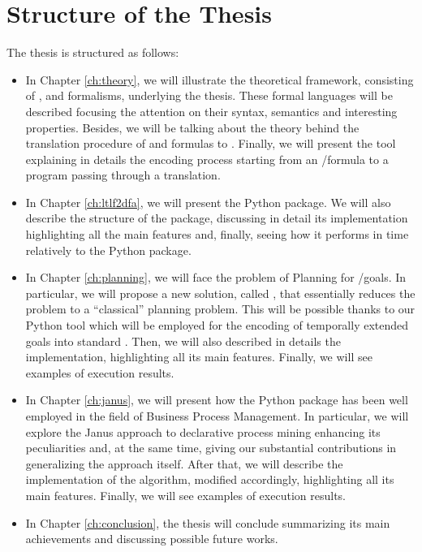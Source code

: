\section{Structure of the Thesis}
The thesis is structured as follows:
\begin{itemize}
\item In Chapter \ref{ch:theory}, we will illustrate the theoretical framework, consisting of \LTL, \LTLf and \PLTL formalisms, underlying the thesis. These formal languages will be described focusing the attention on their syntax, semantics and interesting properties. Besides, we will be talking about the theory behind the translation procedure of \LTLf and \PLTL formulas to \DFAs. Finally, we will present the \MONA tool explaining in details the encoding process starting from an \LTLf/\PLTL formula to a \MONA program passing through a \FOL translation.

\item In Chapter \ref{ch:ltlf2dfa}, we will present the \LTLfToDFA Python package. We will also describe the structure of the package, discussing in detail its implementation highlighting all the main features and, finally, seeing how it performs in time relatively to the \FLLOAT Python package.

\item In Chapter \ref{ch:planning}, we will face the problem of \FOND Planning for \LTLf/\PLTL goals. In particular, we will propose a new solution, called \FONDFOR, that essentially reduces the problem to a ``classical'' \FOND planning problem. This will be possible thanks to our \LTLfToDFA Python tool which will be employed for the encoding of temporally extended goals into standard \PDDL. Then, we will also described in details the \FONDFOR implementation, highlighting all its main features. Finally, we will see examples of execution results.

\item In Chapter \ref{ch:janus}, we will present how the \LTLfToDFA Python package has been well employed in the field of Business Process Management. In particular, we will explore the Janus approach to declarative process mining enhancing its peculiarities and, at the same time, giving our substantial contributions in generalizing the approach itself. After that, we will describe the implementation of the \janus algorithm, modified accordingly, highlighting all its main features. Finally, we will see examples of execution results.

\item In Chapter \ref{ch:conclusion}, the thesis will conclude summarizing its main achievements and discussing possible future works.
\end{itemize}























